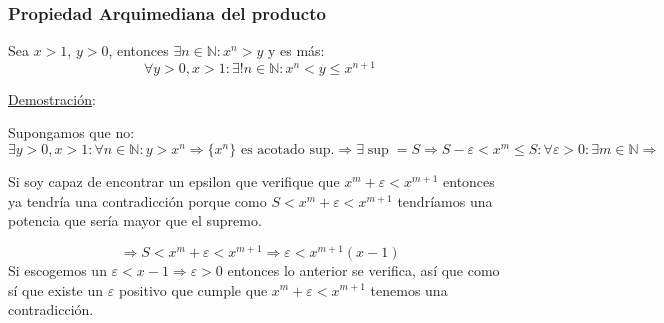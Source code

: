 \documentclass[10pt,a4paper,openright]{book}
\theoremstyle{break}
\begin{document}
\subsubsection{Propiedad Arquimediana del producto}
Sea $x>1$, $y>0$, entonces $\exists n\in \mathbb N: x^n>y$ y es más:
$$\forall y>0, x>1: \exists! n\in\mathbb N: x^n<y\leq x^{n+1}$$

\underline{Demostración}:\par
Supongamos que no:
$$\exists y>0, x>1: \forall n\in \mathbb N: y>x^n\Rightarrow\{x^n\}\mbox{ es acotado sup.}\Rightarrow \exists \sup=S\Rightarrow S-\varepsilon< x^m\leq S: \forall \varepsilon>0:\exists m\in \mathbb N\Rightarrow$$

Si soy capaz de encontrar un epsilon que verifique que $x^m+\varepsilon<x^{m+1}$ entonces ya tendría una contradicción porque como $S<x^m+\varepsilon< x^{m+1}$ tendríamos una potencia que sería mayor que el supremo.

$$\Rightarrow S< x^m +\varepsilon <x^{m+1}\Rightarrow \varepsilon<x^{m+1}(x-1)$$
Si escogemos un $\varepsilon< x-1\Rightarrow \varepsilon>0$ entonces lo anterior se verifica, así que como sí que existe un $\varepsilon$ positivo que cumple que $x^m+\varepsilon< x^{m+1}$ tenemos una contradicción.
\end{document}
